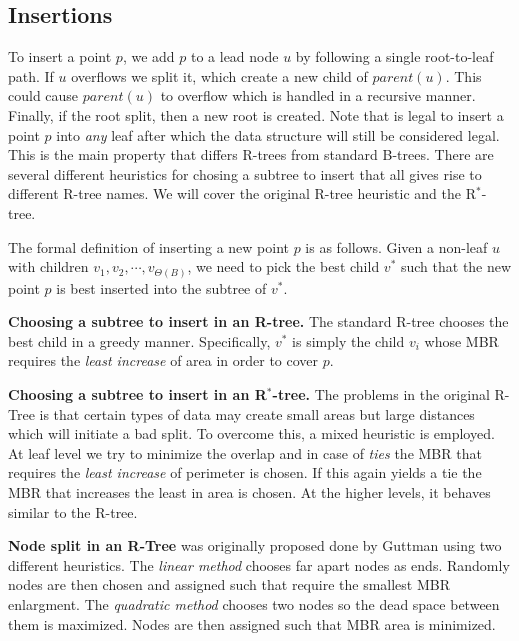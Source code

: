 \documentclass[twoside,11pt,openright]{report}
\begin{document}
\subsection{Insertions}
To insert a point $p$, we add $p$ to a lead node $u$ by following a single root-to-leaf path. If $u$ overflows we split it, which create a new child of $parent(u)$. This could cause $parent(u)$ to overflow which is handled in a recursive manner. Finally, if the root split, then a new root is created. Note that is legal to insert a point $p$ into \textit{any} leaf after which the data structure will still be considered legal. This is the main property that differs R-trees from standard B-trees. There are several different heuristics for chosing a subtree to insert that all gives rise to different R-tree names. We will cover the original R-tree heuristic and the R$^*$-tree.

The formal definition of inserting a new point $p$ is as follows. Given a non-leaf $u$ with children $v_1, v_2, \cdots, v_{\Theta(B)}$, we need to pick the best child $v^*$ such that the new point $p$ is best inserted into the subtree of $v^*$.

\textbf{Choosing a subtree to insert in an R-tree.}  The standard R-tree chooses the best child in a greedy manner. Specifically, $v^*$ is simply the child $v_i$ whose MBR requires the \textit{least increase} of area in order to cover $p$.

\textbf{Choosing a subtree to insert in an R$^*$-tree.} The problems in the original R-Tree is that certain types of data may create small areas but large distances which will initiate a bad split. To overcome this, a mixed heuristic is employed. At leaf level we try to minimize the overlap and in case of \textit{ties} the MBR that requires the \textit{least increase} of perimeter is chosen. If this again yields a tie the MBR that increases the least in area is chosen. At the higher levels, it behaves similar to the R-tree.

\textbf{Node split in an R-Tree} was originally proposed done by Guttman using two different heuristics. The \textit{linear method} chooses far apart nodes as ends. Randomly nodes are then chosen and assigned such that require the smallest MBR enlargment. The \textit{quadratic method} chooses two nodes so the dead space between them is maximized. Nodes are then assigned such that MBR area is minimized.
\end{document}
